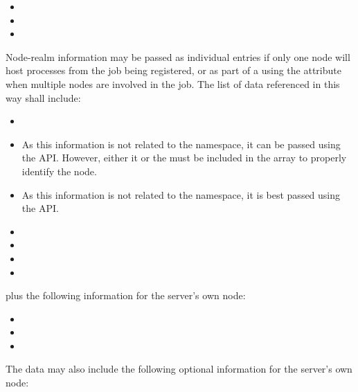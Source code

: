 \begin{itemize}
    \item {}
    \item {}
    \item {}
\end{itemize}


Node-realm information may be passed as individual  entries if only one node will host processes from the job being registered, or as part of a  using the  attribute when multiple nodes are involved in the job. The list of data referenced in this way shall include:

\begin{itemize}
    \item {}
    \item {}As this information is not related to the namespace, it can be passed using the  \ac{API}. However, either it or the  must be included in the array to properly identify the node.
    \pasteAttributeItemEnd
    \item {}As this information is not related to the namespace, it is best passed using the  \ac{API}.
    \pasteAttributeItemEnd
    \item {}
    \item {}
    \item {}
    \item {}
\end{itemize}

plus the following information for the server's own node:

\begin{itemize}
    \item {}
    \item {}
    \item {}
\end{itemize}

The data may also include the following optional information for the server's own node:

